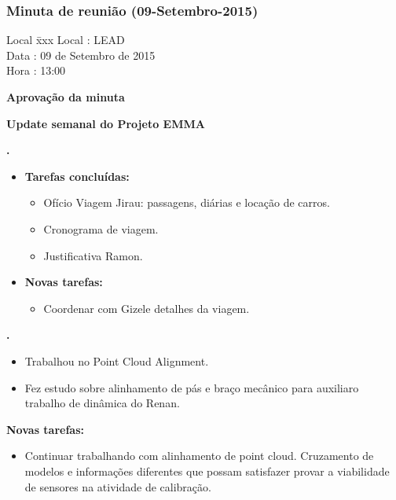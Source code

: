 \subsubsection{Minuta de reunião (09-Setembro-2015)}

\begin{tabbing}
  Local \= xxx \kill
  Local \> : LEAD \\
  Data  \> : 09 de Setembro de 2015 \\
  Hora  \> : 13:00
\end{tabbing}


\textbf{Aprovação da minuta}

\textbf{Update semanal do Projeto EMMA}
   							
\textbf{\alana.} 
	\begin{itemize}
		\item \textbf{Tarefas concluídas:}
			\begin{itemize}    
				\item Ofício Viagem Jirau: passagens, diárias e locação de carros.
				\item Cronograma de viagem.
				\item Justificativa Ramon.
			\end{itemize}
		
		\item \textbf{Novas tarefas:}
			\begin{itemize} 
				\item Coordenar com Gizele detalhes da viagem.
			\end{itemize}
	\end{itemize}   		
						
\textbf{\gabriel.} 
	\begin{itemize}
			\item Trabalhou no Point Cloud Alignment.
			\item Fez estudo sobre alinhamento de pás e braço mecânico para auxiliaro
			trabalho de dinâmica do Renan.
			\end{itemize}
		
		\item \textbf{Novas tarefas:}
			\begin{itemize} 
				\item Continuar trabalhando com alinhamento de point cloud. Cruzamento de
				modelos e informações diferentes que possam satisfazer provar a viabilidade
				de sensores na atividade de calibração.
			\end{itemize}

